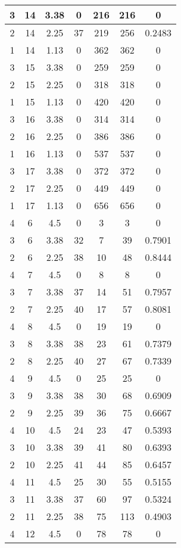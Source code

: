 \documentclass[letterpaper, 12pt]{article}
\begin{document}
\begin{longtable}{|c|c|c|c|c|c|c|}
\hline
3 & 14 & 3.38 & 0 & 216 & 216 & 0 \\
\hline
2 & 14 & 2.25 & 37 & 219 & 256 & 0.2483 \\
\hline
1 & 14 & 1.13 & 0 & 362 & 362 & 0 \\
\hline
3 & 15 & 3.38 & 0 & 259 & 259 & 0 \\
\hline
2 & 15 & 2.25 & 0 & 318 & 318 & 0 \\
\hline
1 & 15 & 1.13 & 0 & 420 & 420 & 0 \\
\hline
3 & 16 & 3.38 & 0 & 314 & 314 & 0 \\
\hline
2 & 16 & 2.25 & 0 & 386 & 386 & 0 \\
\hline
1 & 16 & 1.13 & 0 & 537 & 537 & 0 \\
\hline
3 & 17 & 3.38 & 0 & 372 & 372 & 0 \\
\hline
2 & 17 & 2.25 & 0 & 449 & 449 & 0 \\
\hline
1 & 17 & 1.13 & 0 & 656 & 656 & 0 \\
\hline
4 & 6 & 4.5 & 0 & 3 & 3 & 0 \\
\hline
3 & 6 & 3.38 & 32 & 7 & 39 & 0.7901 \\
\hline
2 & 6 & 2.25 & 38 & 10 & 48 & 0.8444 \\
\hline
4 & 7 & 4.5 & 0 & 8 & 8 & 0 \\
\hline
3 & 7 & 3.38 & 37 & 14 & 51 & 0.7957 \\
\hline
2 & 7 & 2.25 & 40 & 17 & 57 & 0.8081 \\
\hline
4 & 8 & 4.5 & 0 & 19 & 19 & 0 \\
\hline
3 & 8 & 3.38 & 38 & 23 & 61 & 0.7379 \\
\hline
2 & 8 & 2.25 & 40 & 27 & 67 & 0.7339 \\
\hline
4 & 9 & 4.5 & 0 & 25 & 25 & 0 \\
\hline
3 & 9 & 3.38 & 38 & 30 & 68 & 0.6909 \\
\hline
2 & 9 & 2.25 & 39 & 36 & 75 & 0.6667 \\
\hline
4 & 10 & 4.5 & 24 & 23 & 47 & 0.5393 \\
\hline
3 & 10 & 3.38 & 39 & 41 & 80 & 0.6393 \\
\hline
2 & 10 & 2.25 & 41 & 44 & 85 & 0.6457 \\
\hline
4 & 11 & 4.5 & 25 & 30 & 55 & 0.5155 \\
\hline
3 & 11 & 3.38 & 37 & 60 & 97 & 0.5324 \\
\hline
2 & 11 & 2.25 & 38 & 75 & 113 & 0.4903 \\
\hline
4 & 12 & 4.5 & 0 & 78 & 78 & 0 \\

\end{longtable}
\end{document}
